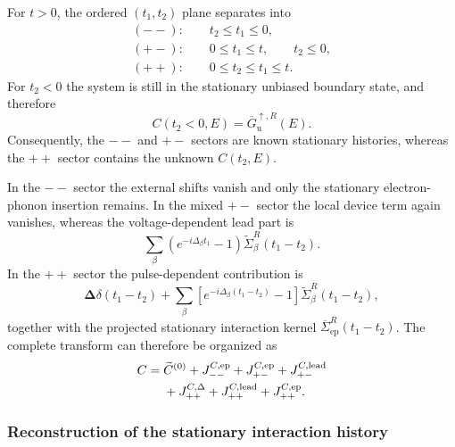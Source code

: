 \documentclass[
 reprint,
 superscriptaddress,
 amsmath,amssymb,
 aps,prb,
 longbibliography,
 floatfix
]{revtex4-2}
\newcommand{\ep}{\mathrm{ep}}
\newcommand{\barSigma}{\overline{\Sigma}}
\begin{document}
For $t>0$, the ordered $(t_1,t_2)$ plane separates into
\begin{equation*}
\begin{gathered}
(--):\qquad t_2\le t_1\le0,
\\
(+-):\qquad 0\le t_1\le t,\qquad t_2\le0,
\\
(++):\qquad 0\le t_2\le t_1\le t.
\end{gathered}
\end{equation*}
For $t_2<0$ the system is still in the stationary unbiased boundary
state, and therefore
\begin{equation*}
C(t_2<0,E)
=
\overline G_{\mathrm u}^{\uparrow,R}(E).
\end{equation*}
Consequently, the $--$ and $+-$ sectors are known stationary histories, whereas the $++$ sector contains the unknown $C(t_2,E)$.

In the $--$ sector the external shifts vanish and only the stationary electron-phonon insertion remains. In the mixed $+-$ sector the local device term again vanishes, whereas the voltage-dependent lead part is
\begin{equation*}
\sum_\beta
\left(
e^{-i\Delta_\beta t_1}-1
\right)
\widetilde\Sigma_\beta^R(t_1-t_2).
\end{equation*}
In the $++$ sector the pulse-dependent contribution is
\begin{equation*}
\bm\Delta\delta(t_1-t_2)
+
\sum_\beta
\left[
e^{-i\Delta_\beta(t_1-t_2)}-1
\right]
\widetilde\Sigma_\beta^R(t_1-t_2),
\end{equation*}
together with the projected stationary interaction kernel $\barSigma_{\ep}^R(t_1-t_2)$. The complete transform can therefore be organized as
\begin{equation*}
\begin{aligned}
C
={}&
\widetilde C^{(0)}
+
J_{--}^{C,\ep}
+
J_{+-}^{C,\ep}
+
J_{+-}^{C,\rm lead}
\\
&+
J_{++}^{C,\Delta}
+
J_{++}^{C,\rm lead}
+
J_{++}^{C,\ep}.
\end{aligned}
\end{equation*}

\subsubsection{Reconstruction of the stationary interaction history}
\end{document}
